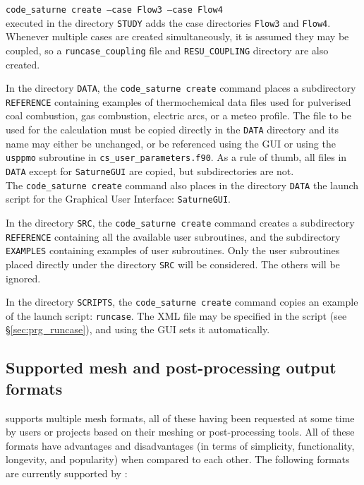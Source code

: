 {{{\noindent
\texttt{code\_saturne~create --case Flow3 --case Flow4}\\
executed in the directory \texttt{STUDY} adds the case directories
\texttt{Flow3} and \texttt{Flow4}. Whenever multiple cases are created simultaneously, it is assumed they may be coupled, so a \texttt{runcase\_coupling} file and \texttt{RESU\_COUPLING} directory are also created.

In the directory \texttt{DATA}, the \texttt{code\_saturne~create} command
places a subdirectory \texttt{REFERENCE} containing examples of thermochemical
data files used for pulverised coal combustion, gas combustion, electric arcs, or
a meteo profile. The file to be used for the calculation must be copied directly
in the \texttt{DATA} directory and its name may either be unchanged, or
be referenced using the GUI or using the \texttt{usppmo} subroutine in
\texttt{cs\_user\_parameters.f90}. As a rule of thumb, all files in \texttt{DATA}
except for \texttt{SaturneGUI} are copied, but subdirectories are not.\\
The \texttt{code\_saturne~create} command also places in the directory
\texttt{DATA} the launch script for the Graphical User Interface:
\texttt{SaturneGUI}.

In the directory \texttt{SRC}, the \texttt{code\_saturne~create} command creates a
subdirectory \texttt{REFERENCE} containing all the available user subroutines,
and the subdirectory \texttt{EXAMPLES} containing examples of user subroutines.
Only the user subroutines placed directly under
the directory \texttt{SRC} will be considered. The others will be ignored.

In the directory \texttt{SCRIPTS}, the \texttt{code\_saturne~create} command copies an example of the launch script: \texttt{runcase}.
The XML file may be specified in the script (see \S\ref{sec:prg_runcase}),
and using the GUI sets it automatically.

\smallskip \noindent

\subsection{Supported mesh and post-processing output formats
\label{sec:formats}}

\CS supports multiple mesh formats, all of these having been requested
at some time by users or projects based on their meshing or post-processing
tools. All of these formats have advantages and disadvantages (in terms
of simplicity, functionality, longevity, and popularity) when compared to
each other. The following formats are currently supported by \CS:

}}}
